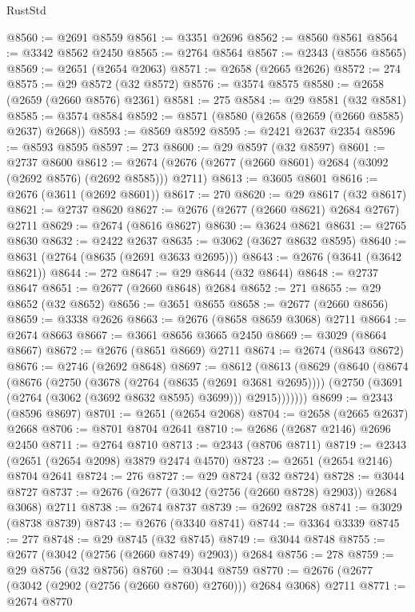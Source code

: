\begin{lexlean}{RustStd}
\begin{coremodule}
{\begin{coremodule}
{{{{{{{{{{{{{{{{{{{{{{{{{{{{{{{{{{{{{{{{{{{{{{{{{{{{{{{@8560 := @2691 @8559
@8561 := @3351 @2696
@8562 := @8560 @8561
@8564 := @3342 @8562 @2450
@8565 := @2764 @8564
@8567 := @2343 (@8556 @8565)
@8569 := @2651 (@2654 @2063)
@8571 := @2658 (@2665 @2626)
@8572 := 274
@8575 := @29 @8572 (@32 @8572)
@8576 := @3574 @8575
@8580 := @2658 (@2659 (@2660 @8576) @2361)
@8581 := 275
@8584 := @29 @8581 (@32 @8581)
@8585 := @3574 @8584
@8592 := @8571 (@8580 (@2658 (@2659 (@2660 @8585) @2637) @2668))
@8593 := @8569 @8592
@8595 := @2421 @2637 @2354
@8596 := @8593 @8595
@8597 := 273
@8600 := @29 @8597 (@32 @8597)
@8601 := @2737 @8600
@8612 := @2674 (@2676 (@2677 (@2660 @8601) @2684 (@3092 (@2692 @8576) (@2692 @8585))) @2711)
@8613 := @3605 @8601
@8616 := @2676 (@3611 (@2692 @8601))
@8617 := 270
@8620 := @29 @8617 (@32 @8617)
@8621 := @2737 @8620
@8627 := @2676 (@2677 (@2660 @8621) @2684 @2767) @2711
@8629 := @2674 (@8616 @8627)
@8630 := @3624 @8621
@8631 := @2765 @8630
@8632 := @2422 @2637
@8635 := @3062 (@3627 @8632 @8595)
@8640 := @8631 (@2764 (@8635 (@2691 @3633 @2695)))
@8643 := @2676 (@3641 (@3642 @8621))
@8644 := 272
@8647 := @29 @8644 (@32 @8644)
@8648 := @2737 @8647
@8651 := @2677 (@2660 @8648) @2684
@8652 := 271
@8655 := @29 @8652 (@32 @8652)
@8656 := @3651 @8655
@8658 := @2677 (@2660 @8656)
@8659 := @3338 @2626
@8663 := @2676 (@8658 @8659 @3068) @2711
@8664 := @2674 @8663
@8667 := @3661 @8656 @3665 @2450
@8669 := @3029 (@8664 @8667)
@8672 := @2676 (@8651 @8669) @2711
@8674 := @2674 (@8643 @8672)
@8676 := @2746 (@2692 @8648)
@8697 := @8612
    (@8613
      (@8629
        (@8640
          (@8674
            (@8676
              (@2750
                (@3678 (@2764 (@8635 (@2691 @3681 @2695))))
                (@2750 (@3691 (@2764 (@3062 (@3692 @8632 @8595) @3699))) @2915)))))))
@8699 := @2343 (@8596 @8697)
@8701 := @2651 (@2654 @2068)
@8704 := @2658 (@2665 @2637) @2668
@8706 := @8701 @8704 @2641
@8710 := @2686 (@2687 @2146) @2696 @2450
@8711 := @2764 @8710
@8713 := @2343 (@8706 @8711)
@8719 := @2343 (@2651 (@2654 @2098) @3879 @2474 @4570)
@8723 := @2651 (@2654 @2146) @8704 @2641
@8724 := 276
@8727 := @29 @8724 (@32 @8724)
@8728 := @3044 @8727
@8737 := @2676 (@2677 (@3042 (@2756 (@2660 @8728) @2903)) @2684 @3068) @2711
@8738 := @2674 @8737
@8739 := @2692 @8728
@8741 := @3029 (@8738 @8739)
@8743 := @2676 (@3340 @8741)
@8744 := @3364 @3339
@8745 := 277
@8748 := @29 @8745 (@32 @8745)
@8749 := @3044 @8748
@8755 := @2677 (@3042 (@2756 (@2660 @8749) @2903)) @2684
@8756 := 278
@8759 := @29 @8756 (@32 @8756)
@8760 := @3044 @8759
@8770 := @2676 (@2677 (@3042 (@2902 (@2756 (@2660 @8760) @2760))) @2684 @3068) @2711
@8771 := @2674 @8770
}}}}}}}}}}}}}}}}}}}}}}}}}}}}}}}}}}}}}}}}}}}}}}}}}}}}}}}
\end{coremodule}}
\end{coremodule}
\end{lexlean}
